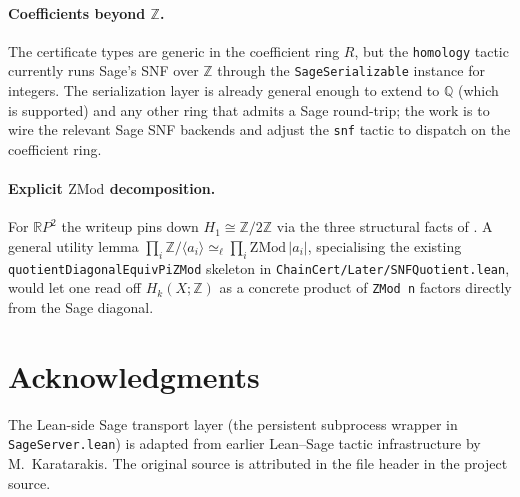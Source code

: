\documentclass[11pt]{article}
\theoremstyle{plain}
\newtheorem{theorem}{Theorem}[section]
\theoremstyle{definition}
\newtheorem{definition}[theorem]{Definition}
\theoremstyle{remark}
\newcommand{\lean}[1]{\lstinline[language=lean]|#1|}
\begin{document}
\paragraph{Coefficients beyond \(\mathbb{Z}\).}
The certificate types are generic in the coefficient ring \(R\), but the
\lean{homology} tactic currently runs Sage's SNF over \(\mathbb{Z}\)
through the \lean{SageSerializable} instance for integers. The
serialization layer is already general enough to extend to \(\mathbb{Q}\)
(which is supported) and any other ring that admits a Sage round-trip; the
work is to wire the relevant Sage SNF backends and adjust the \lean{snf}
tactic to dispatch on the coefficient ring.

\paragraph{Explicit \(\mathrm{ZMod}\) decomposition.}
For \(\mathbb{R}P^2\) the writeup pins down
\(H_1\cong\mathbb{Z}/2\mathbb{Z}\) via the three structural facts of
. A general utility lemma
\(\prod_i \mathbb{Z}/\langle a_i\rangle \simeq_\ell \prod_i
\mathrm{ZMod}\,|a_i|\), specialising the existing
\lean{quotientDiagonalEquivPiZMod} skeleton in
\texttt{ChainCert/Later/SNFQuotient.lean}, would let one read off
\(H_k(X;\mathbb{Z})\) as a concrete product of \lean{ZMod n} factors
directly from the Sage diagonal.

\section*{Acknowledgments}
The Lean-side Sage transport layer (the persistent subprocess wrapper in \texttt{SageServer.lean}) is adapted from earlier Lean--Sage tactic infrastructure by M.~Karatarakis. The original source is attributed in the file header in the project source.



\end{document}
